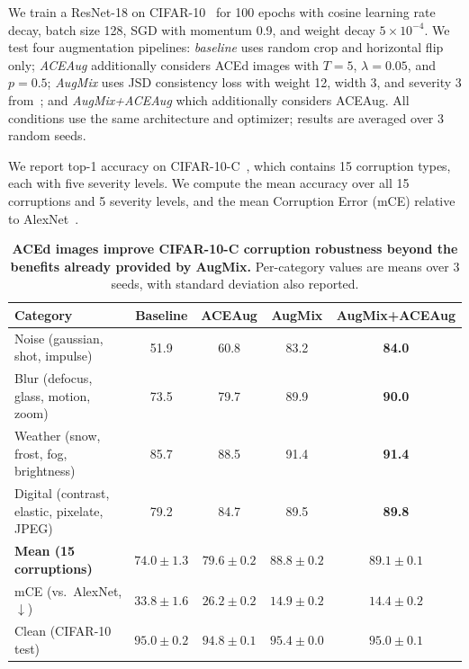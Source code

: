 We train a ResNet-18 on CIFAR-10~\citep{krizhevsky2009learning} for 100 epochs with cosine learning rate decay, batch size 128, SGD with momentum 0.9, and weight decay $5\times10^{-4}$.
We test four augmentation pipelines: \emph{baseline} uses random crop and horizontal flip only; \emph{ACEAug} additionally considers ACEd images with $T=5$, $\lambda=0.05$, and $p=0.5$; \emph{AugMix} uses JSD consistency loss with weight 12, width 3, and severity 3 from~\citet{hendrycks2020augmix}; and \emph{AugMix+ACEAug} which additionally considers ACEAug.
All conditions use the same architecture and optimizer; results are averaged over 3 random seeds.

We report top-1 accuracy on CIFAR-10-C~\citep{hendrycks2019benchmarking}, which contains 15 corruption types, each with five severity levels.
We compute the mean accuracy over all 15 corruptions and 5 severity levels, and the mean Corruption Error (mCE) relative to AlexNet~\citep{krizhevsky2012imagenet}.

\begin{table}[h]
  \centering
  \small
  \caption{
    \textbf{ACEd images improve CIFAR-10-C corruption robustness beyond the benefits already provided by AugMix.}
    Per-category values are means over 3 seeds, with standard deviation also reported.}
  \label{tab:cifar_c}
  \begin{tabular}{lcccc}
    \toprule
    Category & Baseline & ACEAug & AugMix & AugMix+ACEAug \\
    \midrule
    Noise (gaussian, shot, impulse)             & 51.9 & 60.8 & 83.2 & \textbf{84.0} \\
    Blur (defocus, glass, motion, zoom)          & 73.5 & 79.7 & 89.9 & \textbf{90.0} \\
    Weather (snow, frost, fog, brightness)      & 85.7 & 88.5 & 91.4 & \textbf{91.4} \\
    Digital (contrast, elastic, pixelate, JPEG) & 79.2 & 84.7 & 89.5 & \textbf{89.8} \\
    \midrule
    \textbf{Mean (15 corruptions)}              & $74.0 \pm 1.3$ & $79.6 \pm 0.2$ & $88.8 \pm 0.2$ & $\mathbf{89.1 \pm 0.1}$ \\
    mCE (vs.\ AlexNet, $\downarrow$)            & $33.8 \pm 1.6$ & $26.2 \pm 0.2$ & $14.9 \pm 0.2$ & $\mathbf{14.4 \pm 0.2}$ \\
    \midrule
    Clean (CIFAR-10 test)                       & $95.0 \pm 0.2$ & $94.8 \pm 0.1$ & $95.4 \pm 0.0$ & $95.0 \pm 0.1$ \\
    \bottomrule
  \end{tabular}
\end{table}

